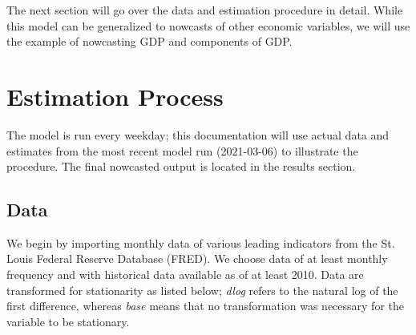 \documentclass[11pt, letterpaper]{article}\usepackage[]{graphicx}\usepackage[]{color}
\begin{document}
The next section will go over the data and estimation procedure in detail. While this model can be generalized to nowcasts of other economic variables, we will use the example of nowcasting GDP and components of GDP.

\newpage
\section{Estimation Process}
The model is run every weekday; this documentation will use actual data and estimates from the most recent model run (2021-03-06) to illustrate the procedure. The final nowcasted output is located in the results section.

\subsection{Data}
We begin by importing monthly data of various leading indicators from the St. Louis Federal Reserve Database (FRED). We choose data of at least monthly frequency and with historical data available as of at least 2010. Data are transformed for stationarity as listed below; \textit{dlog} refers to the natural log of the first difference, whereas \textit{base} means that no transformation was necessary for the variable to be stationary.
\end{document}
